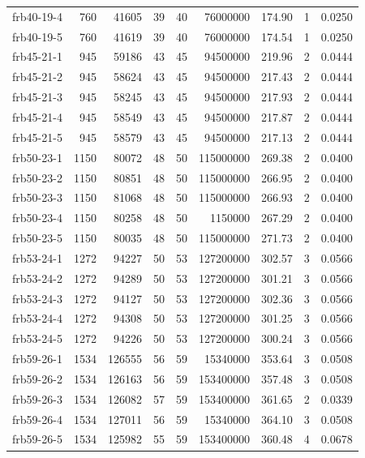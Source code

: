 {\begin{longtable}{lrrrrrrrr}
frb40-19-4 & 760 & 41605 & 39 & 40 & 76000000 & 174.90 & 1 & 0.0250 \\
frb40-19-5 & 760 & 41619 & 39 & 40 & 76000000 & 174.54 & 1 & 0.0250 \\
frb45-21-1 & 945 & 59186 & 43 & 45 & 94500000 & 219.96 & 2 & 0.0444 \\
frb45-21-2 & 945 & 58624 & 43 & 45 & 94500000 & 217.43 & 2 & 0.0444 \\
frb45-21-3 & 945 & 58245 & 43 & 45 & 94500000 & 217.93 & 2 & 0.0444 \\
frb45-21-4 & 945 & 58549 & 43 & 45 & 94500000 & 217.87 & 2 & 0.0444 \\
frb45-21-5 & 945 & 58579 & 43 & 45 & 94500000 & 217.13 & 2 & 0.0444 \\
frb50-23-1 & 1150 & 80072 & 48 & 50 & 115000000 & 269.38 & 2 & 0.0400 \\
frb50-23-2 & 1150 & 80851 & 48 & 50 & 115000000 & 266.95 & 2 & 0.0400 \\
frb50-23-3 & 1150 & 81068 & 48 & 50 & 115000000 & 266.93 & 2 & 0.0400 \\
frb50-23-4 & 1150 & 80258 & 48 & 50 & 1150000 & 267.29 & 2 & 0.0400 \\
frb50-23-5 & 1150 & 80035 & 48 & 50 & 115000000 & 271.73 & 2 & 0.0400 \\
frb53-24-1 & 1272 & 94227 & 50 & 53 & 127200000 & 302.57 & 3 & 0.0566 \\
frb53-24-2 & 1272 & 94289 & 50 & 53 & 127200000 & 301.21 & 3 & 0.0566 \\
frb53-24-3 & 1272 & 94127 & 50 & 53 & 127200000 & 302.36 & 3 & 0.0566 \\
frb53-24-4 & 1272 & 94308 & 50 & 53 & 127200000 & 301.25 & 3 & 0.0566 \\
frb53-24-5 & 1272 & 94226 & 50 & 53 & 127200000 & 300.24 & 3 & 0.0566 \\
frb59-26-1 & 1534 & 126555 & 56 & 59 & 15340000 & 353.64 & 3 & 0.0508 \\
frb59-26-2 & 1534 & 126163 & 56 & 59 & 153400000 & 357.48 & 3 & 0.0508 \\
frb59-26-3 & 1534 & 126082 & 57 & 59 & 153400000 & 361.65 & 2 & 0.0339 \\
frb59-26-4 & 1534 & 127011 & 56 & 59 & 15340000 & 364.10 & 3 & 0.0508 \\
frb59-26-5 & 1534 & 125982 & 55 & 59 & 153400000 & 360.48 & 4 & 0.0678 \\
\end{longtable}}

